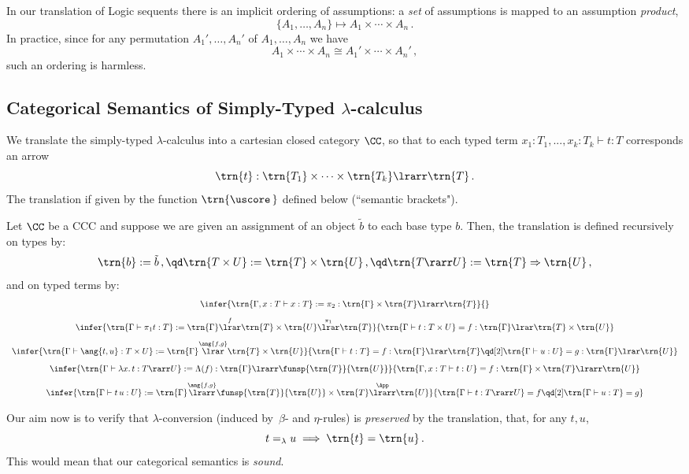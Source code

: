\documentclass{svmult}
\begin{document}
\begin{myremark}
In our translation of Logic sequents there is an implicit ordering of assumptions: a \emph{set} of assumptions is mapped to an assumption \emph{product},
\[ \{A_1,\dots,A_n\} \longmapsto A_1\times\cdots\times A_n\,. \]
In practice, since for any permutation $A_1',\dots,A_n'$ of $A_1,\dots,A_n$ we have
\[ A_1\times\cdots\times A_n \cong A_1'\times\cdots\times A_n'\,,\]
such an ordering is harmless.
\end{myremark}

\subsection{Categorical Semantics of Simply-Typed $\lambda$-calculus}

We translate the simply-typed $\lambda$-calculus into a cartesian closed category $\CC$, so that to each typed term $x_1:T_1,...,x_k:T_k\vdash t:T$
corresponds an arrow
\[ \trn{t}:\trn{T_1}\times\cdots\times\trn{T_k}\lrarr\trn{T}\,. \]
The translation if given by the function $\trn{\uscore\,}$ defined below (``semantic brackets").

\begin{mydefinition}\label{d:SemTr}
Let $\CC$ be a CCC and suppose we are given an assignment of an object $\tilde{b}$ to each base type $b$. Then, the translation is defined recursively
on types by:
\[ \trn{b}:=\tilde{b} \,,\qd \trn{T\times U}:=\trn{T}\times\trn{U} \,,\qd \trn{T\rarr U}:=\trn{T}\Rightarrow\trn{U}\,, \]
and on typed terms by:
\[\begin{array}{c}
\infer{\trn{\Gamma,x:T\vdash x:T} := \pi_2:\trn{\Gamma}\times\trn{T}\lrarr\trn{T}}{}
\\[3mm]
\infer{\trn{\Gamma\vdash\pi_1 t:T}:=\trn{\Gamma}\overset{f}{\lrar}\trn{T}\times\trn{U}\overset{\pi_1}{\lrar}\trn{T}}{%
    \trn{\Gamma\vdash t:T\times U}=f:\trn{\Gamma}\lrar\trn{T}\times\trn{U}}
\\[3mm]
\infer{\trn{\Gamma\vdash \ang{t,u}:T\times U}:=\trn{\Gamma}\overset{\ang{f,g}}{\lrar}\trn{T}\times\trn{U}}{%
    \trn{\Gamma\vdash t:T}=f:\trn{\Gamma}\lrar\trn{T}\qd[2]\trn{\Gamma\vdash u:U}=g:\trn{\Gamma}\lrar\trn{U}}
\\[3mm]
\infer{\trn{\Gamma\vdash\lambda x.\,t:T\rarr U}:=\Lambda(f):\trn{\Gamma}\lrarr\funsp{\trn{T}}{\trn{U}}}{%
    \trn{\Gamma,x:T\vdash t:U}=f:\trn{\Gamma}\times\trn{T}\lrarr\trn{U}}
\\[3mm]
\infer{\trn{\Gamma\vdash t\,u: U}:=\trn{\Gamma}\overset{\ang{f,g}}{\lrarr}\funsp{\trn{T}}{\trn{U}}\times\trn{T}
    \overset{\App}{\lrarr}\trn{U}}{%
        \trn{\Gamma\vdash t:T\rarr U}=f\qd[2]\trn{\Gamma\vdash u:T}=g}
\end{array}\]\deq[-1]
\end{mydefinition}
%
Our aim now is to verify that $\lambda$-conversion (induced by~$\beta$- and $\eta$-rules) is \emph{preserved} by the translation, \ie that, for any
$t,u$,
\[ t=_\lambda u \implies \trn{t}=\trn{u}\,. \]
This would mean that our categorical semantics is \emph{sound}.
\end{document}
